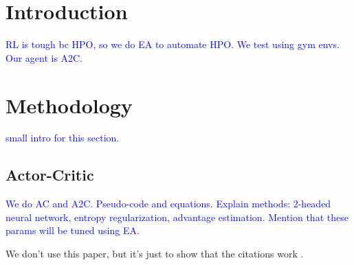 \documentclass{article}
\newcommand{\TODO}[1]{\textcolor{blue}{#1}}
\begin{document}

\printAffiliationsAndNotice{}

\section{Introduction}
\label{sec:intro}

\TODO{RL is tough bc HPO, so we do EA to automate HPO. We test using gym envs. Our agent is A2C.}

\section{Methodology}
\label{sec:meth}

\TODO{small intro for this section.}

\subsection{Actor-Critic}
\label{ssec:ac}

\TODO{
    We do AC and A2C.
    Pseudo-code and equations.
    Explain methods: 2-headed neural network, entropy regularization, advantage estimation.
    Mention that these params will be tuned using EA.
}

We don't use this paper, but it's just to show that the citations work \cite{han2020actorcritic}.
\end{document}
